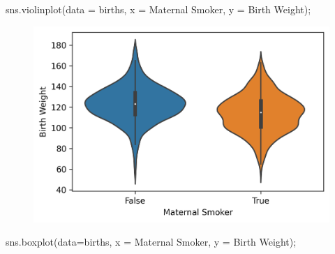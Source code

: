 \documentclass[
  letterpaper,
  DIV=11,
  numbers=noendperiod]{scrreprt}
\newenvironment{Shaded}{\begin{snugshade}}{\end{snugshade}}
\newcommand{\NormalTok}[1]{\textcolor[rgb]{0.00,0.23,0.31}{#1}}
\newcommand{\OperatorTok}[1]{\textcolor[rgb]{0.37,0.37,0.37}{#1}}
\newcommand{\StringTok}[1]{\textcolor[rgb]{0.13,0.47,0.30}{#1}}
\begin{document}
\begin{Shaded}
\begin{Highlighting}[]
\NormalTok{sns.violinplot(data }\OperatorTok{=}\NormalTok{ births, x }\OperatorTok{=} \StringTok{\textquotesingle{}Maternal Smoker\textquotesingle{}}\NormalTok{, y }\OperatorTok{=} \StringTok{\textquotesingle{}Birth Weight\textquotesingle{}}\NormalTok{)}\OperatorTok{;}
\end{Highlighting}
\end{Shaded}

\begin{figure}[H]

{\centering \includegraphics{visualization_1/visualization_1_files/figure-pdf/cell-22-output-1.png}

}

\end{figure}

\begin{Shaded}
\begin{Highlighting}[]
\NormalTok{sns.boxplot(data}\OperatorTok{=}\NormalTok{births, x }\OperatorTok{=} \StringTok{\textquotesingle{}Maternal Smoker\textquotesingle{}}\NormalTok{, y }\OperatorTok{=} \StringTok{\textquotesingle{}Birth Weight\textquotesingle{}}\NormalTok{)}\OperatorTok{;}
\end{Highlighting}
\end{Shaded}
\end{document}
